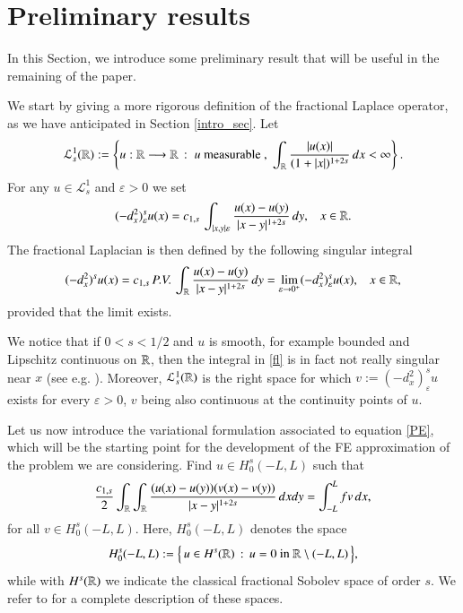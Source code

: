 \section{Preliminary results}\label{theor_sec}

In this Section, we introduce some preliminary result that will be useful in the remaining of the paper.

We start by giving a more rigorous definition of the fractional Laplace operator, as we have anticipated in Section \ref{intro_sec}. Let
\begin{align*}
	\mathcal L^1_s(\mathbb{R}) :=\left\{ u:\mathbb{R}\longrightarrow\mathbb{R}\,:\; u\textrm{ measurable },\;\int_{\mathbb{R}}\frac{|u(x)|}{(1+|x|)^{1+2s}}\,dx<\infty\right\}.
\end{align*}
For any $u\in\mathcal L_s^1$ and $\varepsilon>0$ we set 
\begin{align*}
	(-d_x^2)^s_{\varepsilon} u(x) = c_{1,s}\,\int_{|x,y|\varepsilon}\frac{u(x)-u(y)}{|x-y|^{1+2s}}\,dy,\;\;\; x\in\mathbb{R}.
\end{align*}
The fractional Laplacian is then defined by the following singular integral
\begin{align}\label{fl}
	(-d_x^2)^{s}u(x) = c_{1,s}\,P.V.\,\int_{\mathbb{R}}\frac{u(x)-u(y)}{|x-y|^{1+2s}}\,dy = \lim_{\varepsilon\to 0^+} (-d_x^2)^s_{\varepsilon} u(x), \;\;\; x\in\mathbb{R},
\end{align}
provided that the limit exists. 

We notice that if $0<s<1/2$ and $u$ is smooth, for example bounded and Lipschitz continuous on $\mathbb{R}$, then the integral in \eqref{fl} is in fact not really singular near $x$ (see e.g. \cite[Remark 3.1]{dihitchhiker}). Moreover, $\mathcal L_s^1(\mathbb{R})$ is the right space for which $v:= (-d_x^2)^s_{\varepsilon} u$ exists for every $\varepsilon > 0$, $v$ being also continuous at the continuity points of $u$.

Let us now introduce the variational formulation associated to equation \eqref{PE}, which will be the starting point for the development of the FE approximation of the problem we are considering. Find $u\in H^s_0(-L,L)$ such that
\begin{align}\label{WF}
	\frac{c_{1,s}}{2} \int_{\mathbb{R}}\int_{\mathbb{R}}\frac{(u(x)-u(y))(v(x)-v(y))}{|x-y|^{1+2s}}\,dxdy = \int_{-L}^L fv\,dx,	
\end{align}
for all $v\in H_0^s(-L,L)$. Here, $H^s_0(-L,L)$ denotes the space 
\begin{align*}
	H^s_0(-L,L) :=\Big\{\, u\in H^s(\mathbb{R})\,:\,u=0 \textrm{ in } \mathbb{R}\setminus(-L,L)\,\Big\}, 
\end{align*}
while with $H^s(\mathbb{R})$ we indicate the classical fractional Sobolev space of order $s$. We refer to \cite{dihitchhiker} for a complete description of these spaces.  


